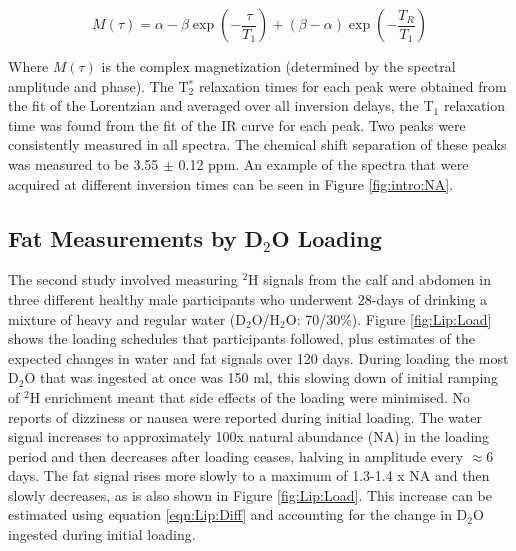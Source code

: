 \documentclass[class=article, crop=false]{standalone}
\begin{document}
\begin{equation}
    M(\tau) = \alpha - \beta\exp(-\frac{\tau}{T_1}) + (\beta - \alpha)\exp(-\frac{T_R}{T_1})
    \label{eqn:Lip:IR}
\end{equation}

Where $M(\tau)$ is the complex magnetization (determined by the spectral amplitude and phase). The T$_2^*$ relaxation times for each peak were obtained from the fit of the Lorentzian and averaged over all inversion delays, the T$_1$ relaxation time was found from the fit of the IR curve for each peak. Two peaks were consistently measured in all spectra. The chemical shift separation of these peaks was measured to be 3.55 $\pm$ 0.12 ppm. An example of the spectra that were acquired at different inversion times can be seen in Figure \ref{fig:intro:NA}.

\subsection{Fat Measurements by D$_2$O Loading}

The second study involved measuring $^2$H signals from the calf and abdomen in three different healthy male participants who underwent 28-days of drinking a mixture of heavy and regular water (D$_2$O/H$_2$O: 70/30\%). Figure \ref{fig:Lip:Load} shows the loading schedules that participants followed, plus estimates of the expected changes in water and fat signals over 120 days. During loading the most D$_2$O that was ingested at once was 150 ml, this slowing down of initial ramping of $^2$H enrichment meant that side effects of the loading were minimised. No reports of dizziness or nausea were reported during initial loading. The water signal increases to approximately 100x natural abundance (NA) in the loading period and then decreases after loading ceases, halving in amplitude every $\approx$6 days. The fat signal rises more slowly to a maximum of 1.3-1.4 x NA and then slowly decreases, as is also shown in Figure \ref{fig:Lip:Load}. This increase can be estimated using equation \ref{eqn:Lip:Diff} and accounting for the change in D$_2$O ingested during initial loading.  
\end{document}
